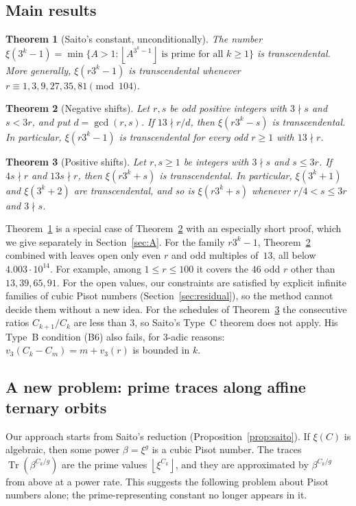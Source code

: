 \documentclass[11pt,a4paper]{article}
\newtheorem{maintheorem}{Theorem}
\theoremstyle{definition}
\theoremstyle{remark}
\DeclareMathOperator{\Tr}{Tr}
\newcommand{\floor}[1]{\left\lfloor #1\right\rfloor}
\begin{document}
\subsection{Main results}
\begin{maintheorem}[Saito's constant, unconditionally]\label{thm:A}
The number $\xi(3^k-1)=\min\{A>1:\floor{A^{3^k-1}}\text{ is prime for all }k\ge1\}$ is transcendental.
More generally, $\xi(r3^k-1)$ is transcendental whenever $r\equiv1,3,9,27,35,81\pmod{104}$.
\end{maintheorem}

\begin{maintheorem}[Negative shifts]\label{thm:B}
Let $r,s$ be odd positive integers with $3\nmid s$ and $s<3r$, and put $d=\gcd(r,s)$.
If $13\nmid r/d$, then $\xi(r3^k-s)$ is transcendental.
In particular, $\xi(r3^k-1)$ is transcendental for every odd $r\ge1$ with $13\nmid r$.
\end{maintheorem}

\begin{maintheorem}[Positive shifts]\label{thm:C}
Let $r,s\ge1$ be integers with $3\nmid s$ and $s\le 3r$.
If $4s\nmid r$ and $13s\nmid r$, then $\xi(r3^k+s)$ is transcendental.
In particular, $\xi(3^k+1)$ and $\xi(3^k+2)$ are transcendental, and so is $\xi(r3^k+s)$ whenever $r/4<s\le 3r$ and $3\nmid s$.
\end{maintheorem}

Theorem~\ref{thm:A} is a special case of Theorem~\ref{thm:B} with an especially short proof, which we give separately in Section~\ref{sec:A}.
For the family $r3^k-1$, Theorem~\ref{thm:B} combined with \cite[Corollary~2.7]{SaiVar} leaves open only even $r$ and odd multiples of~$13$, all below $4.003\cdot10^{14}$.
For example, among $1\le r\le100$ it covers the $46$ odd $r$ other than $13,39,65,91$.
For the open values, our constraints are satisfied by explicit infinite families of cubic Pisot numbers (Section~\ref{sec:residual}), so the method cannot decide them without a new idea.
For the schedules of Theorem~\ref{thm:C} the consecutive ratios $C_{k+1}/C_k$ are less than $3$, so Saito's Type~C theorem does not apply.
His Type~B condition (B6) also fails, for $3$-adic reasons: $v_3(C_k-C_m)=m+v_3(r)$ is bounded in $k$.

\subsection{A new problem: prime traces along affine ternary orbits}
Our approach starts from Saito's reduction (Proposition~\ref{prop:saito}).
If $\xi(C)$ is algebraic, then some power $\beta=\xi^g$ is a cubic Pisot number.
The traces $\Tr(\beta^{C_k/g})$ are the prime values $\floor{\xi^{C_k}}$, and they are approximated by $\beta^{C_k/g}$ from above at a power rate.
This suggests the following problem about Pisot numbers alone; the prime-representing constant no longer appears in it.
\end{document}
